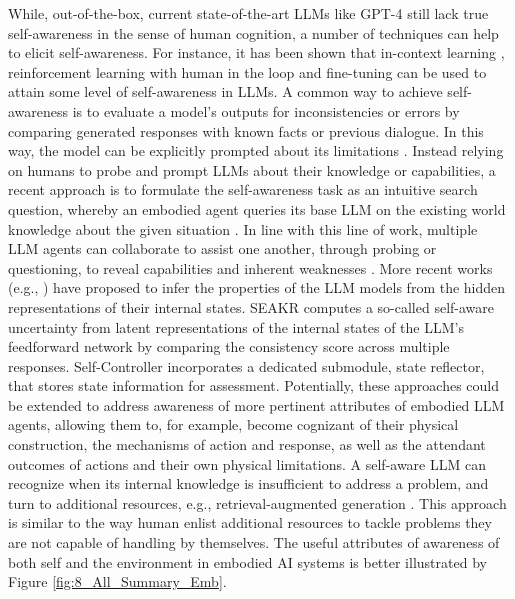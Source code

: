\documentclass[10pt,journal,compsoc]{IEEEtran}
\begin{document}
	While, out-of-the-box, current state-of-the-art LLMs like GPT-4 still lack true self-awareness in the sense of human cognition, a number of techniques can help to elicit self-awareness. For instance, it has been shown that in-context learning \cite{yin2023large}, reinforcement learning with human in the loop \cite{ouyang2022training} and fine-tuning \cite{laine2024me} can be used to attain some level of self-awareness in LLMs. A common way to achieve self-awareness is to evaluate a model’s outputs for inconsistencies or errors by comparing generated responses with known facts or previous dialogue. In this way, the model can be explicitly prompted about its limitations  \cite{wang2023self,gao2023retrieval}. Instead relying on humans to probe and prompt LLMs about their knowledge or capabilities, a recent approach is to formulate the self-awareness task as an intuitive search question, whereby an embodied agent queries its base LLM on the existing world knowledge about the given situation \cite{cheng2024can,zhu2024bootstrapping,amayuelas2023knowledge}.   In line with this line of work, multiple LLM agents can collaborate to assist one another, through probing or questioning, to reveal  capabilities and inherent weaknesses \cite{feng2024don}. More recent works (e.g., \cite{yao2024seakr,liang2024internal,peng2024self}) have proposed to infer the properties of the LLM models from the hidden representations of their internal states. SEAKR \cite{yao2024seakr} computes a so-called self-aware uncertainty from latent representations of the internal states of the LLM's feedforward network by comparing the consistency score across multiple responses. Self-Controller \cite{peng2024self} incorporates a dedicated submodule, state reflector, that stores state information for assessment. Potentially, these approaches could be extended to address awareness of more pertinent attributes of embodied LLM agents, allowing them to, for example, become cognizant of their physical construction, the mechanisms of action and response, as well as the attendant outcomes of actions and their own physical limitations. A self-aware LLM can recognize when its internal knowledge is insufficient to address a problem, and turn to additional resources, e.g., retrieval-augmented generation \cite{lewis2020retrieval,jiang2023active}. This approach is similar to the way human enlist additional resources to tackle problems they are not capable of handling by themselves. The useful attributes of awareness of both self and the environment in embodied AI systems is better illustrated by Figure \ref{fig:8_All_Summary_Emb}.
	
\end{document}
